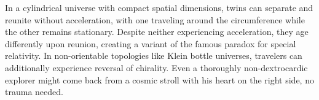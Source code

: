 In a cylindrical universe with compact spatial dimensions, twins can separate and reunite without acceleration, with one traveling around the circumference while the other remains stationary. Despite neither experiencing acceleration, they age differently upon reunion, creating a variant of the famous paradox for special relativity. In non-orientable topologies like Klein bottle universes, travelers can additionally experience reversal of chirality. Even a thoroughly non-dextrocardic explorer might come back from a cosmic stroll with his heart on the right side, no trauma needed.
